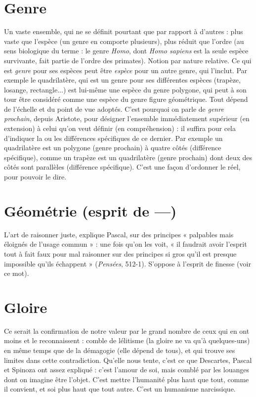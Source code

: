 \section{Genre}
Un vaste ensemble, qui ne se définit pourtant que par rapport à
d’autres : plus vaste que l’espèce (un genre en comporte plusieurs),
plus réduit que l’ordre (au sens biologique du terme : le genre {\it Homo}, dont
{\it Homo sapiens} est la seule espèce survivante, fait partie de l’ordre des primates).
Notion par nature relative. Ce qui est {\it genre} pour ses espèces peut être
{\it espèce} pour un autre genre, qui l’inclut. Par exemple le quadrilatère, qui est
un genre pour ses différentes espèces (trapèze, losange, rectangle...) est lui-même
une espèce du genre polygone, qui peut à son tour être considéré
comme une espèce du genre figure géométrique. Tout dépend de l'échelle et
du point de vue adoptés. C’est pourquoi on parle de {\it genre prochain}, depuis
Aristote, pour désigner l’ensemble immédiatement supérieur (en extension) à
celui qu’on veut définir (en compréhension) : il suffira pour cela d’indiquer
la ou les différences spécifiques de ce dernier. Par exemple un quadrilatère est
un polygone (genre prochain) à quatre côtés (différence spécifique), comme
un trapèze est un quadrilatère (genre prochain) dont deux des côtés sont
parallèles (différence spécifique). C’est une façon d’ordonner le réel, pour
pouvoir le dire.

\section{Géométrie (esprit de —)}
L’art de raisonner juste, explique Pascal, sur
des principes « palpables mais éloignés de
l'usage commun » : une fois qu’on les voit, « il faudrait avoir l'esprit tout à fait
faux pour mal raisonner sur des principes si gros qu’il est presque impossible
qu’ils échappent » ({\it Pensées}, 512-1). S’oppose à l'esprit de finesse (voir ce mot).

\section{Gloire}
Ce serait la confirmation de notre valeur par le grand nombre de
ceux qui en ont moins et le reconnaissent : comble de lélitisme (la
gloire ne va qu’à quelques-uns) en même temps que de la démagogie (elle
dépend de tous), et qui trouve ses limites dans cette contradiction. Qu'elle
nous tente, c’est ce que Descartes, Pascal et Spinoza ont assez expliqué : c’est
l'amour de soi, mais comblé par les louanges dont on imagine être l’objet. C’est
mettre l'humanité plus haut que tout, comme il convient, et soi plus haut que
tout autre. C’est un humanisme narcissique.

